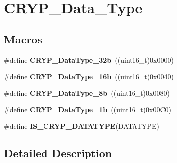 \hypertarget{group___c_r_y_p___data___type}{\section{C\-R\-Y\-P\-\_\-\-Data\-\_\-\-Type}
\label{group___c_r_y_p___data___type}
}
\subsection*{Macros}
\begin{DoxyCompactItemize}
\item 
\hypertarget{group___c_r_y_p___data___type_gae15c7cabc8c325af4d547614ff24e2d8}{\#define {\bfseries C\-R\-Y\-P\-\_\-\-Data\-Type\-\_\-32b}~((uint16\-\_\-t)0x0000)}\label{group___c_r_y_p___data___type_gae15c7cabc8c325af4d547614ff24e2d8}

\item 
\hypertarget{group___c_r_y_p___data___type_ga6af3c4d9f6f8c2b8cbf86c640fd053a7}{\#define {\bfseries C\-R\-Y\-P\-\_\-\-Data\-Type\-\_\-16b}~((uint16\-\_\-t)0x0040)}\label{group___c_r_y_p___data___type_ga6af3c4d9f6f8c2b8cbf86c640fd053a7}

\item 
\hypertarget{group___c_r_y_p___data___type_ga6f4f176ec21c1670ae7a1af03e714367}{\#define {\bfseries C\-R\-Y\-P\-\_\-\-Data\-Type\-\_\-8b}~((uint16\-\_\-t)0x0080)}\label{group___c_r_y_p___data___type_ga6f4f176ec21c1670ae7a1af03e714367}

\item 
\hypertarget{group___c_r_y_p___data___type_gacc3a4c23852b4f4f647b6923d7384875}{\#define {\bfseries C\-R\-Y\-P\-\_\-\-Data\-Type\-\_\-1b}~((uint16\-\_\-t)0x00\-C0)}\label{group___c_r_y_p___data___type_gacc3a4c23852b4f4f647b6923d7384875}

\item 
\#define {\bfseries I\-S\-\_\-\-C\-R\-Y\-P\-\_\-\-D\-A\-T\-A\-T\-Y\-P\-E}(D\-A\-T\-A\-T\-Y\-P\-E)
\end{DoxyCompactItemize}


\subsection{Detailed Description}


